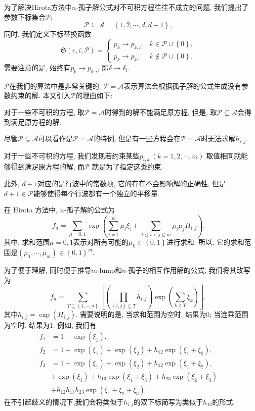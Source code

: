 \documentclass[12pt,a4paper,UTF8]{article}
\newcommand{\sbrace}[1]{\left(#1\right)}
\newcommand{\mbrace}[1]{\left[#1\right]}
\newcommand{\bbrace}[1]{\left\{#1\right\}}
\newcommand{\ALLP}{\mathcal{A}}
\newcommand{\PS}{\mathcal{P}}
\newcommand{\SP}{\mathfrak{S}} %
\newcommand{\MLNS}{$m$-lump和$n$-孤子的相互作用解}
\begin{document}
为了解决Hirota方法中$n$-孤子解公式对不可积方程往往不成立的问题, 我们提出了参数下标集合$\PS$: 
\begin{equation}
\PS\subseteq \ALLP=\bbrace{1,2,\cdots,d,d+1} ,
\end{equation}
同时, 我们定义下标替换函数
\begin{equation}
\SP\sbrace{e,i;\PS}=\left\{\begin{array}{ll}
  p_k \to p_{k,i}, & k \in \PS \cup \bbrace{0},\\ 
  p_k \to p_k , & k \not\in\PS \cup \bbrace{0}.
\end{array}\right.
\end{equation}
需要注意的是, 始终有$p_0\to p_{0,i}$, 即$\delta\to \delta_i$. 

$\PS$在我们的算法中是非常关键的. $\PS= \ALLP$表示算法会根据孤子解的公式生成没有参数约束的解. 本文引入$\PS$的理由如下: 
\begin{compactenum}[1. ]
\item 对于一些不可积的方程, 取$\PS= \ALLP$时得到的解不能满足原方程. 但是, 取$\PS\subsetneq  \ALLP$会得到满足原方程的解.
\item 尽管$\PS\subsetneq  \ALLP$可以看作是$\PS= \ALLP$的特例, 但是有一些方程会在$\PS= \ALLP$时无法求解$h_{i,j}$.
\item 对于一些不可积的方程, 我们发现若约束某些$p_{i,k}~(k=1,2,\cdots,m)$ 取值相同就能够得到满足原方程的解, 而$\PS$ 就是为了指定这类约束.
\end{compactenum}

此外, $d+1$对应的是行波中的常数项, 它的存在不会影响解的正确性, 但是$d+1\in \PS$能够使得每个行波都有一个独立的平移量.

在 Hirota 方法中, $n$-孤子解的公式为 
\begin{equation}
f_n=\sum_{\mu=0,1}\exp\sbrace{\sum_{i=1}^m{\mu_i \xi_i}+\sum_{1\le i<j\le m}{\mu_i\mu_jH_{i,j}}}.
\label{soliton-old}
\end{equation}
其中, 求和范围$\mu=0,1$表示对所有可能的$\mu_k\in \bbrace{0,1}$进行求和. 所以, 它的求和范围是$\sbrace{\mu_1,\cdots,\mu_m}\in \bbrace{0,1}^m$.

为了便于理解, 同时便于推导\MLNS{}的公式, 我们将其改写为
\begin{equation}
f_n=\sum_{T\subseteq \bbrace{1,\cdots,n}}\mbrace{\sbrace{\prod_{\bbrace{i,j}\subseteq T}{h_{i,j}}}\exp\sbrace{\sum_{k\in T}{\xi_k}}}, 
\label{soliton-new}
\end{equation}
其中$h_{i,j}=\exp(H_{i,j})$. 需要说明的是, 当求和范围为空时, 结果为0; 当连乘范围为空时, 结果为1. 例如, 我们有
\begin{equation}
\begin{aligned}
f_1&=1+\exp(\xi_1) , \\ 
f_2&=1+\exp(\xi_1)+\exp(\xi_2)+h_{12}\exp(\xi_1+\xi_2) ,\\ 
f_3&=1+\exp(\xi_1)+\exp(\xi_2)+h_{12}\exp(\xi_1+\xi_2) ,\\ 
   &+\exp(\xi_3)+h_{13}\exp(\xi_1+\xi_3)+h_{23}\exp(\xi_2+\xi_3) \\
   &+h_{12}h_{13}h_{23}\exp(\xi_1+\xi_2+\xi_3) .
\end{aligned}
\end{equation}
在不引起歧义的情况下,我们会将类似于$h_{i,j}$的双下标简写为类似于$h_{12}$的形式. 
\end{document}
